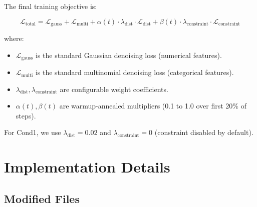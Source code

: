 \documentclass{article}
\begin{document}
The final training objective is:

\begin{equation}
\mathcal{L}_{\text{total}} = \mathcal{L}_{\text{gauss}} + \mathcal{L}_{\text{multi}} + \alpha(t) \cdot \lambda_{\text{dist}} \cdot \mathcal{L}_{\text{dist}} + \beta(t) \cdot \lambda_{\text{constraint}} \cdot \mathcal{L}_{\text{constraint}}
\end{equation}

where:
\begin{itemize}
  \item $\mathcal{L}_{\text{gauss}}$ is the standard Gaussian denoising loss (numerical features).
  \item $\mathcal{L}_{\text{multi}}$ is the standard multinomial denoising loss (categorical features).
  \item $\lambda_{\text{dist}}, \lambda_{\text{constraint}}$ are configurable weight coefficients.
  \item $\alpha(t), \beta(t)$ are warmup-annealed multipliers (0.1 to 1.0 over first 20\% of steps).
\end{itemize}

For Cond1, we use $\lambda_{\text{dist}} = 0.02$ and $\lambda_{\text{constraint}} = 0$ (constraint disabled by default).

\section{Implementation Details}

\subsection{Modified Files}
\end{document}
